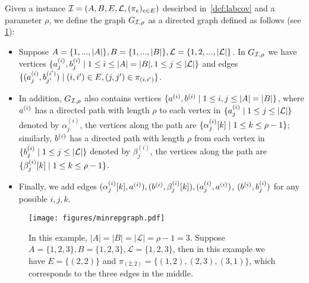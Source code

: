 \begin{definition}\label{def:minrepgraph}
	Given a \labcov{} instance $\mathcal{I}=(A,B,E,\mathcal{L},(\pi_e)_{e\in E})$ descirbed in~\cref{def:labcov} and a parameter $\rho$, we define the \labcov{} graph $G_{\mathcal{I},\rho}$ as a directed graph defined as follows (see \cref{fig:minrepgraph}):
	\begin{itemize}
		\item Suppose $A=\{1,...,|A|\},B=\{1,...,|B|\},\mathcal{L}=\{1,2,...,|\mathcal{L}|\}$. In $G_{\mathcal{I},\rho}$ we have vertices $\{a^{(i)}_{j},b^{(i)}_{j}\mid 1\le i\le |A|=|B|, 1\le j\le |\mathcal{L}|\}$ and edges $\{(a^{(i)}_{j},b^{(i')}_{j'})\mid (i,i')\in E, (j,j')\in\pi_{(i,i')}\}$.
		
		\item In addition, $G_{\mathcal{I},\rho}$ also contains vertices $\{a^{(i)},b^{(i)}\mid 1\le i,j\le |A|=|B|\}$, where $a^{(i)}$ has a directed path with length $\rho$ to each vertex in $\{a^{(i)}_{j}\mid 1\le j\le |\mathcal{L}|\}$ denoted by $\alpha^{(i)}_j$, the vertices along the path are $\{\alpha^{(i)}_{j}[k]\mid 1\le k\le \rho-1\}$; similarly, $b^{(i)}$ has a directed path with length $\rho$ from each vertex in $\{b^{(i)}_{j}\mid 1\le j\le |\mathcal{L}|\}$ denoted by $\beta^{(i)}_j$, the vertices along the path are $\{\beta^{(i)}_{j}[k]\mid 1\le k\le \rho-1\}$. 
		
		\item Finally, we add edges $(\alpha^{(i)}_{j}[k],a^{(i)}),(b^{(i)},\beta^{(i)}_{j}[k]),(a^{(i)}_{j},a^{(i)})$, $(b^{(i)},b^{(i)}_{j})$ for any possible $i,j,k$.
	\end{itemize}
	
\end{definition}

\begin{figure}[H]
	\centering
	\texttt{[image: figures/minrepgraph.pdf]}
	\caption{\small In this example, $|A|=|B|=|\mathcal{L}|=\rho-1=3$. Suppose $A=\{1,2,3\},B=\{1,2,3\},\mathcal{L}=\{1,2,3\}$, then in this example we have $E=\{(2,2)\}$ and $\pi_{(2,2)}=\{(1,2),(2,3),(3,1)\}$, which corresponds to the three edges in the middle. }\label{fig:minrepgraph}	
\end{figure}


